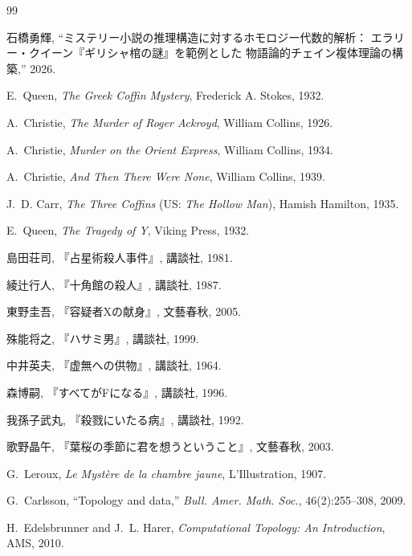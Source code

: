 \documentclass[12pt,twocolumn]{ltjsarticle}
\begin{document}
\begin{thebibliography}{99}

石橋勇輝,
``ミステリー小説の推理構造に対するホモロジー代数的解析：
エラリー・クイーン『ギリシャ棺の謎』を範例とした
物語論的チェイン複体理論の構築,''
2026.

E.~Queen,
\textit{The Greek Coffin Mystery},
Frederick A. Stokes, 1932.

A.~Christie,
\textit{The Murder of Roger Ackroyd},
William Collins, 1926.

A.~Christie,
\textit{Murder on the Orient Express},
William Collins, 1934.

A.~Christie,
\textit{And Then There Were None},
William Collins, 1939.

J.~D. Carr,
\textit{The Three Coffins} (US: \textit{The Hollow Man}),
Hamish Hamilton, 1935.

E.~Queen,
\textit{The Tragedy of Y},
Viking Press, 1932.

島田荘司, 『占星術殺人事件』, 講談社, 1981.

綾辻行人, 『十角館の殺人』, 講談社, 1987.

東野圭吾, 『容疑者Xの献身』, 文藝春秋, 2005.

殊能将之, 『ハサミ男』, 講談社, 1999.

中井英夫, 『虚無への供物』, 講談社, 1964.

森博嗣, 『すべてがFになる』, 講談社, 1996.

我孫子武丸, 『殺戮にいたる病』, 講談社, 1992.

歌野晶午, 『葉桜の季節に君を想うということ』, 文藝春秋, 2003.

G.~Leroux,
\textit{Le Myst\`{e}re de la chambre jaune},
L'Illustration, 1907.

G.~Carlsson,
``Topology and data,''
\textit{Bull. Amer. Math. Soc.},
46(2):255--308, 2009.

H.~Edelsbrunner and J.~L. Harer,
\textit{Computational Topology: An Introduction},
AMS, 2010.


\end{thebibliography}
\end{document}
